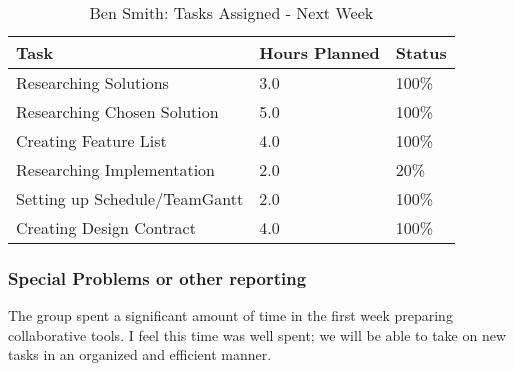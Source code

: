 \documentclass[12pt,article,compsoc]{IEEEtran}
\begin{document}
	\begin{table}[ht]
	\renewcommand{\arraystretch}{1.3}
		\caption{Ben Smith: Tasks Assigned - Next Week}
		
		\label{Summary of Ben Smith's activites: this week}
		
		\centering
		\begin{tabular}{p{5.5cm}|p{1cm}|p{1cm}}

		\hline
		\bfseries 		Task		 							& \bfseries Hours Planned		& \bfseries Status	\\
		\hline\hline
						Researching Solutions					& 3.0							& 100\%				\\
						Researching Chosen Solution				& 5.0							& 100\%				\\
						Creating Feature List					& 4.0							& 100\%				\\
						Researching Implementation				& 2.0							& 20\%				\\
						Setting up Schedule/TeamGantt			& 2.0							& 100\%				\\
						Creating Design Contract				& 4.0							& 100\%				\\
					
					
		\hline
		\end{tabular}
	\end{table}

	\subsubsection*{Special Problems or other reporting}
	The group spent a significant amount of time in the first week preparing collaborative tools. I feel this time was well spent; 
	we will be able to take on new tasks in an organized and efficient manner. 	
	
\end{document}

